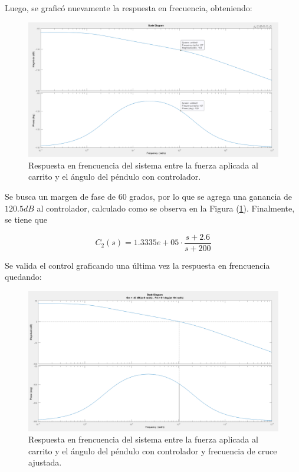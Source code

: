 Luego, se graficó nuevamente la respuesta en frecuencia, obteniendo:

\begin{figure}[H]
	\centering
	\includegraphics[width=0.8\linewidth]{Imagenes/loopshaping/bode_cerrando_q_con_controlador}
	\caption{Respuesta en frencuencia del sistema entre la fuerza aplicada al carrito y el ángulo del péndulo con controlador.}
	\label{bode_cerrando_q_con_controlador}
\end{figure}

Se busca un margen de fase de $60$ grados, por lo que se agrega una ganancia de $120.5 dB$ al controlador, calculado como se observa en la Figura (\ref{bode_cerrando_q_con_controlador}). Finalmente, se tiene que

\begin{equation}
C_2(s) = 1.3335e+05 \cdot \frac{s+2.6}{s+200}
\end{equation}

Se valida el control graficando una última vez la respuesta en frencuencia quedando:

\begin{figure}[H]
	\centering
	\includegraphics[width=0.8\linewidth]{Imagenes/loopshaping/bode_cerrando_q_con_controlador_ganancia}
	\caption{Respuesta en frencuencia del sistema entre la fuerza aplicada al carrito y el ángulo del péndulo con controlador y frecuencia de cruce ajustada.}
	\label{bode_cerrando_q_con_controlador_ganancia}
\end{figure}

